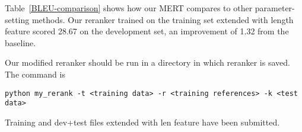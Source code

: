 Table~\ref{BLEU-comparison} shows how our MERT compares to other parameter-setting methods. Our reranker trained on the training set extended with length feature scored 28.67 on the development set, an improvement of 1.32 from the baseline.

Our modified reranker should be run in a directory in which reranker is saved. The command is
\begin{lstlisting}
python my_rerank -t <training data> -r <training references> -k <test data>
\end{lstlisting}
Training and dev+test files extended with len feature have been submitted.
